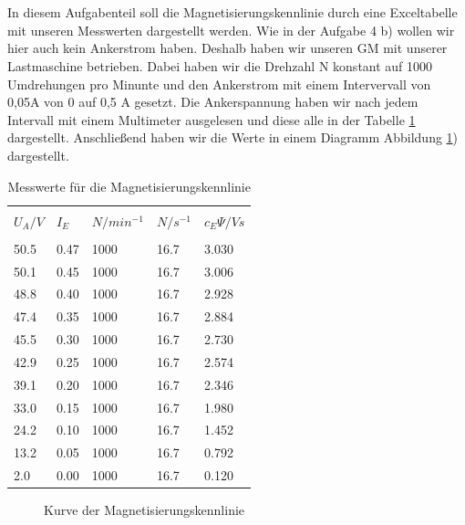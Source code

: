 \section{}
In diesem Aufgabenteil soll die Magnetisierungskennlinie durch eine Exceltabelle mit unseren Messwerten dargestellt werden. Wie in der Aufgabe 4 b) wollen wir hier auch kein Ankerstrom haben. Deshalb haben wir unseren GM mit unserer Lastmaschine betrieben. Dabei haben wir die Drehzahl N konstant auf 1000 Umdrehungen pro Minunte und den Ankerstrom mit einem Intervervall von 0,05A von 0 auf 0,5 A gesetzt. Die Ankerspannung haben wir nach jedem Intervall mit einem Multimeter ausgelesen und diese alle in der Tabelle \ref{tab:5c:cepsi} dargestellt. Anschließend haben wir die Werte in einem Diagramm Abbildung \ref{fig:5c:kennlinie}) dargestellt.  
\begin{table}[h]
	\centering
	\begin{tabular}{p{1.5cm} p{1.5cm} p{1.5cm} p{1.5cm} | p{1.5cm}}
		&&&&\\[-1em]
		$ U_{A}/V $ & $ I_{E} $ & $ N/min^{-1} $ & $ N/s^{-1} $ &  $ c_{E}\Psi/Vs $\\
		\hline &&&&\\[-1em]
		50.5 & 0.47 & 1000 & 16.7 & 3.030\\
		50.1 & 0.45 & 1000 & 16.7 & 3.006\\
		48.8 & 0.40 & 1000 & 16.7 & 2.928\\
		47.4 & 0.35 & 1000 & 16.7 & 2.884\\
		45.5 & 0.30 & 1000 & 16.7 & 2.730\\
		42.9 & 0.25 & 1000 & 16.7 & 2.574\\
		39.1 & 0.20 & 1000 & 16.7 & 2.346\\
		33.0 & 0.15 & 1000 & 16.7 & 1.980\\
		24.2 & 0.10 & 1000 & 16.7 & 1.452\\
		13.2 & 0.05 & 1000 & 16.7 & 0.792\\
		2.0 & 0.00 & 1000 & 16.7 & 0.120		
	\end{tabular}
	\caption{Messwerte für die Magnetisierungskennlinie }
	\label{tab:5c:cepsi}
\end{table}


\begin{figure}[h]
	\centering
	
	\caption{Kurve der Magnetisierungskennlinie}
	\label{fig:5c:kennlinie}
\end{figure}


